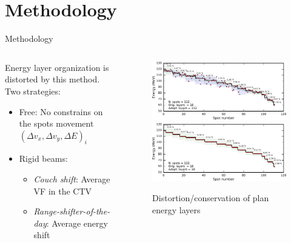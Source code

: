 \documentclass[pdf,dvipsnames,aspectratio=169]{beamer}
\begin{document}
\section{Methodology}
\begin{frame}[c]{Methodology}
    \begin{columns}[c]
        \begin{column}{0.45\textwidth}
            Energy layer organization is distorted by this method.\\

            Two strategies:
            \begin{itemize}
                \item {\color{brandeisblue} Free:} No constrains on the spots movement $(\Delta v_x, \Delta v_y, \Delta E)_i$
                \item {\color{brandeisblue} Rigid beams:}
                \begin{itemize}
                    \item \textit{Couch shift}: Average VF in the CTV
                    \item \textit{Range-shifter-of-the-day}: Average energy shift
                \end{itemize}
            \end{itemize}
        \end{column}
        \begin{column}{0.55\textwidth}
            \vspace*{-0.4cm}
            \begin{figure}[b!]
                \centering
                \includegraphics[width=\textwidth]{imgs/plan_energy_layer_destruction.pdf}\\
                \includegraphics[width=\textwidth]{imgs/plan_energy_layer_conservation.pdf}
                \caption{Distortion/conservation of plan energy layers}
            \end{figure}
        \end{column}
    \end{columns}
\end{frame}
\end{document}
